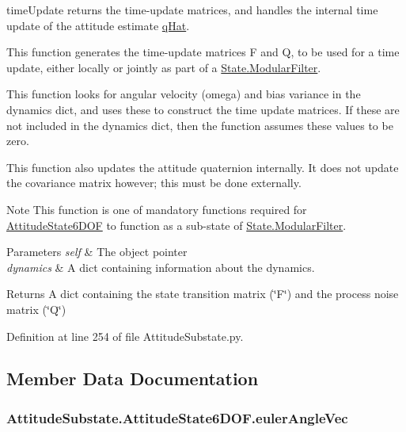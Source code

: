 time\+Update returns the time-\/update matrices, and handles the internal time update of the attitude estimate \hyperlink{classAttitudeSubstate_1_1AttitudeState6DOF_a36a58a47280151dd544762d9a1d5c35d}{q\+Hat}. 

This function generates the time-\/update matrices F and Q, to be used for a time update, either locally or jointly as part of a \hyperlink{classState_1_1ModularFilter}{State.\+Modular\+Filter}.

This function looks for angular velocity (omega) and bias variance in the dynamics dict, and uses these to construct the time update matrices. If these are not included in the dynamics dict, then the function assumes these values to be zero.

This function also updates the attitude quaternion internally. It does not update the covariance matrix however; this must be done externally.

\begin{DoxyNote}{Note}
This function is one of mandatory functions required for \hyperlink{classAttitudeSubstate_1_1AttitudeState6DOF}{Attitude\+State6\+D\+OF} to function as a sub-\/state of \hyperlink{classState_1_1ModularFilter}{State.\+Modular\+Filter}.
\end{DoxyNote}

\begin{DoxyParams}{Parameters}
{\em self} & The object pointer \\
\hline
{\em dynamics} & A dict containing information about the dynamics.\\
\hline
\end{DoxyParams}
\begin{DoxyReturn}{Returns}
A dict containing the state transition matrix (\char`\"{}\+F\char`\"{}) and the process noise matrix (\char`\"{}\+Q\char`\"{}) 
\end{DoxyReturn}


Definition at line 254 of file Attitude\+Substate.\+py.



\subsection{Member Data Documentation}
\subsubsection[{\texorpdfstring{euler\+Angle\+Vec}{eulerAngleVec}}]{\setlength{\rightskip}{0pt plus 5cm}Attitude\+Substate.\+Attitude\+State6\+D\+O\+F.\+euler\+Angle\+Vec}\hypertarget{classAttitudeSubstate_1_1AttitudeState6DOF_af87f4ef871d05fbd84e7e7c91a2865a3}{}\label{classAttitudeSubstate_1_1AttitudeState6DOF_af87f4ef871d05fbd84e7e7c91a2865a3}


